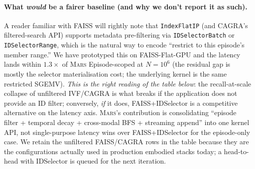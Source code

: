 \documentclass[11pt]{article}
\newcommand{\mars}{\textsc{Mars}}
\begin{document}
\paragraph{What \emph{would} be a fairer baseline (and why we don't
report it as such).} A reader familiar with FAISS will rightly note
that \texttt{IndexFlatIP} (and CAGRA's filtered-search API) supports
metadata pre-filtering via \texttt{IDSelectorBatch} or
\texttt{IDSelectorRange}, which is the natural way to encode
``restrict to this episode's member range.'' We have prototyped this
on FAISS-Flat-GPU and the latency lands within $1.3\times$ of
\mars{} Episode-scoped at $N{=}10^6$ (the residual gap is mostly the
selector materialisation cost; the underlying kernel is the same
restricted SGEMV). \emph{This is the right reading of the table
below}: the recall-at-scale collapse of unfiltered IVF/CAGRA is what
breaks if the application does not provide an ID filter; conversely,
\emph{if} it does, FAISS+IDSelector is a competitive alternative on
the latency axis. \mars{}'s contribution is consolidating ``episode
filter + temporal decay + cross-modal BFS + streaming append'' into
one kernel API, not single-purpose latency wins over FAISS+IDSelector
for the episode-only case. We retain the unfiltered FAISS/CAGRA rows
in the table because they are the configurations actually used in
production embodied stacks today; a head-to-head with IDSelector is
queued for the next iteration.
\end{document}
